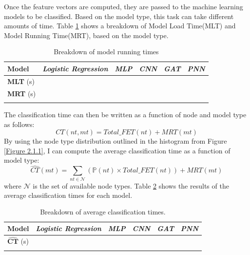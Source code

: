 			Once the feature vectors are computed, they are passed to the machine learning models to be classified. Based on the model type, this task can take different amounts of time. Table \ref{Table: eval/service-time/classification/MRT} shows a breakdown of Model Load Time(MLT) and Model Running Time(MRT), based on the model type. 
			
			\begin{longtable}{|p{.15\textwidth}||p{}|p{}|p{}|p{}|p{}|}
				\textbf{Model} & \textit{Logistic Regression} & \textit{MLP} & \textit{CNN} & \textit{GAT} & \textit{PNN} \\
				\hline
				\textbf{MLT} (s) & & & & & \\
				\hline
				\textbf{MRT} (s) & & & & & \\
				\hline
				\caption{Breakdown of model running times}
				\label{Table: eval/service-time/classification/MRT}
			\end{longtable} 
			The classification time can then be written as a function of node and model type as follows:
			\begin{equation}
				CT(nt, mt) = Total\_FET(nt) + MRT(mt)
			\end{equation}
			By using the node type distribution outlined in the histogram from Figure \ref{Figure 2.1.1}, I can compute the average classification time as a function of model type:
			\begin{equation}
				\hat{CT}(mt) = \sum_{nt\in \mathbf{\mathcal{N}}} (\mathbb{P}(nt) \times Total\_FET(nt)) + MRT(mt) 
			\end{equation}  
			where $\mathcal{N}$ is the set of available node types. Table \ref{Table: eval/service-time/classification/CT} shows the results of the average classification times for each model. 
			
			\begin{longtable}{|p{}||p{}|p{}|p{}|p{}|p{}|}
				\textbf{Model} & \textit{Logistic Regression} & \textit{MLP} & \textit{CNN} & \textit{GAT} & \textit{PNN} \\
				\hline
				$\mathbf{\hat{CT}}$ (s) & & & & & \\
				\hline
				\caption{Breakdown of average classification times.}
				\label{Table: eval/service-time/classification/CT}
			\end{longtable}
			
